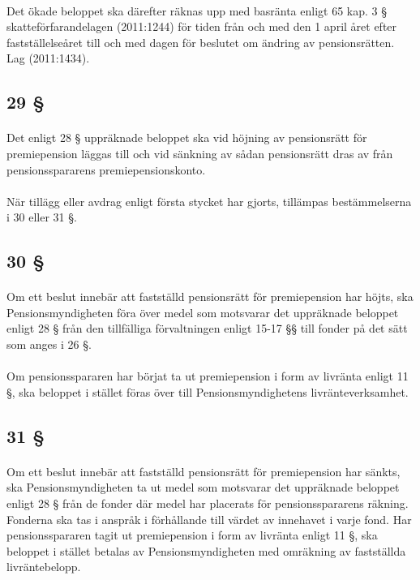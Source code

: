 \documentclass[a4paper,notitlepage,openany,10pt]{book}
\begin{document}
\paragraph*{}
Det ökade beloppet ska därefter räknas upp med basränta enligt 65 kap. 3 § skatteförfarandelagen (2011:1244) för tiden från och med den 1 april året efter fastställelseåret till och med dagen för beslutet om ändring av pensionsrätten.
Lag (2011:1434).
\subsection*{29 §}
\paragraph*{}
Det enligt 28 § uppräknade beloppet ska vid höjning av pensionsrätt för premiepension läggas till och vid sänkning av sådan pensionsrätt dras av från pensionsspararens premiepensionskonto.
\paragraph*{}
När tillägg eller avdrag enligt första stycket har gjorts, tillämpas bestämmelserna i 30 eller 31 §.
\subsection*{30 §}
\paragraph*{}
Om ett beslut innebär att fastställd pensionsrätt för premiepension har höjts, ska Pensionsmyndigheten föra över medel som motsvarar det uppräknade beloppet enligt 28 § från den tillfälliga förvaltningen enligt 15-17 §§ till fonder på det sätt som anges i 26 §.
\paragraph*{}
Om pensionsspararen har börjat ta ut premiepension i form av livränta enligt 11 §, ska beloppet i stället föras över till Pensionsmyndighetens livränteverksamhet.
\subsection*{31 §}
\paragraph*{}
Om ett beslut innebär att fastställd pensionsrätt för premiepension har sänkts, ska Pensionsmyndigheten ta ut medel som motsvarar det uppräknade beloppet enligt 28 § från de fonder där medel har placerats för pensionsspararens räkning.
Fonderna ska tas i anspråk i förhållande till värdet av innehavet i varje fond. Har pensionsspararen tagit ut premiepension i form av livränta enligt 11 §, ska beloppet i stället betalas av Pensionsmyndigheten med omräkning av fastställda livräntebelopp.
\end{document}
